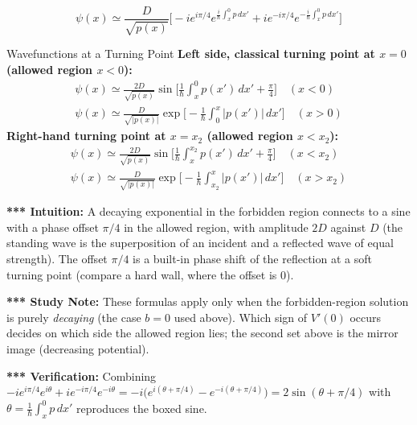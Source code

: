 \documentclass[11pt,a4paper]{article}
\begin{document}
\[
\psi(x)\simeq\frac D{\sqrt{p(x)}}\Big[-ie^{i\pi/4}e^{\frac i\hbar\int_x^0p\,dx'} + ie^{-i\pi/4}e^{-\frac i\hbar\int_x^0p\,dx'}\Big]
\]
\begin{thm}{Wavefunctions at a Turning Point}
\textbf{Left side, classical turning point at $x=0$ (allowed region $x<0$):}
\begin{gather*}
\psi(x)\simeq\frac{2D}{\sqrt{p(x)}}\sin\Big[\frac1\hbar\int_x^0p(x')\,dx' + \frac\pi4\Big]\quad(x<0)\\
\psi(x)\simeq\frac D{\sqrt{|p(x)|}}\exp\Big[-\frac1\hbar\int_0^x|p(x')|\,dx'\Big]\quad(x>0)
\end{gather*}
\textbf{Right-hand turning point at $x=x_2$ (allowed region $x<x_2$):}
\begin{gather*}
\psi(x)\simeq\frac{2D}{\sqrt{p(x)}}\sin\Big[\frac1\hbar\int_x^{x_2}p(x')\,dx' + \frac\pi4\Big]\quad(x<x_2)\\
\psi(x)\simeq\frac D{\sqrt{|p(x)|}}\exp\Big[-\frac1\hbar\int_{x_2}^x|p(x')|\,dx'\Big]\quad(x>x_2)
\end{gather*}
\end{thm}
\textbf{*** Intuition:} A decaying exponential in the forbidden region connects to a sine with a phase offset $\pi/4$ in the allowed region, with amplitude $2D$ against $D$ (the standing wave is the superposition of an incident and a reflected wave of equal strength). The offset $\pi/4$ is a built-in phase shift of the reflection at a soft turning point (compare a hard wall, where the offset is $0$).

\textbf{*** Study Note:} These formulas apply only when the forbidden-region solution is purely \textit{decaying} (the case $b=0$ used above). Which sign of $V'(0)$ occurs decides on which side the allowed region lies; the second set above is the mirror image (decreasing potential).

\textbf{*** Verification:} Combining $-ie^{i\pi/4}e^{i\theta}+ie^{-i\pi/4}e^{-i\theta} = -i\big(e^{i(\theta+\pi/4)}-e^{-i(\theta+\pi/4)}\big) = 2\sin(\theta+\pi/4)$ with $\theta=\frac1\hbar\int_x^0p\,dx'$ reproduces the boxed sine. \checkmark
\end{document}
